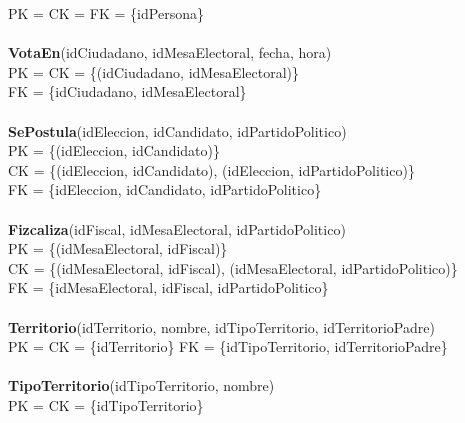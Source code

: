  PK = CK = FK = \{idPersona\}\\
\\
\textbf{VotaEn}(idCiudadano, idMesaElectoral, fecha, hora)\\
  PK = CK = \{(idCiudadano, idMesaElectoral)\}\\
  FK = \{idCiudadano, idMesaElectoral\}\\
\\
\textbf{SePostula}(idEleccion, idCandidato, idPartidoPolitico)\\
  PK = \{(idEleccion, idCandidato)\}\\
  CK = \{(idEleccion, idCandidato), (idEleccion, idPartidoPolitico)\}\\
  FK = \{idEleccion, idCandidato, idPartidoPolitico\}\\
\\
\textbf{Fizcaliza}(idFiscal, idMesaElectoral, idPartidoPolitico)\\
  PK = \{(idMesaElectoral, idFiscal)\}\\
  CK = \{(idMesaElectoral, idFiscal), (idMesaElectoral, idPartidoPolitico)\}\\
  FK = \{idMesaElectoral, idFiscal, idPartidoPolitico\}\\
\\
\textbf{Territorio}(idTerritorio, nombre, idTipoTerritorio, idTerritorioPadre)\\
  PK = CK = \{idTerritorio\}
  FK = \{idTipoTerritorio, idTerritorioPadre\}\\
\\
\textbf{TipoTerritorio}(idTipoTerritorio, nombre)\\
  PK = CK = \{idTipoTerritorio\}\\	